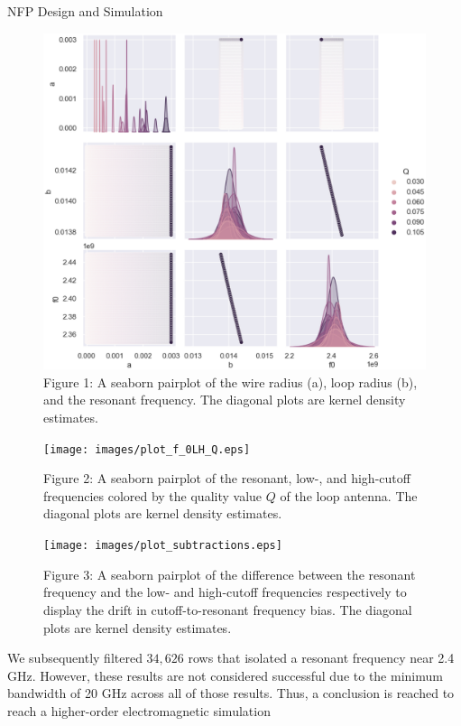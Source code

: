 \documentclass[12pt]{article}
\begin{document}
\begin{section} {NFP Design and Simulation}
\begin{figure}
    \centering
    \includegraphics[scale=0.30]{images/plot_abQf0.eps}
    \caption{Figure 1: A seaborn pairplot of the wire radius (a), loop radius (b), and the resonant frequency.  The diagonal plots are kernel density estimates.}
    \label{fig:1}
\end{figure}

\begin{figure}
    \centering
    \texttt{[image: images/plot\_f\_0LH\_Q.eps]}
    \caption{Figure 2: A seaborn pairplot of the resonant, low-, and high-cutoff frequencies colored by the quality value $Q$ of the loop antenna. The diagonal plots are kernel density estimates.}
    \label{fig:2}
\end{figure}

\begin{figure}
    \centering
    \texttt{[image: images/plot\_subtractions.eps]}
    \caption{Figure 3: A seaborn pairplot of the difference between the resonant frequency and the low- and high-cutoff frequencies respectively to display the drift in cutoff-to-resonant frequency bias. The diagonal plots are kernel density estimates.}
    \label{fig:3}
\end{figure}

We subsequently filtered $34,626$ rows that isolated a resonant frequency near 2.4 GHz. However, these results are not considered successful due to the minimum bandwidth of 20 GHz across all of those results.  Thus, a conclusion is reached to reach a higher-order electromagnetic simulation 


\end{section}
\end{document}
